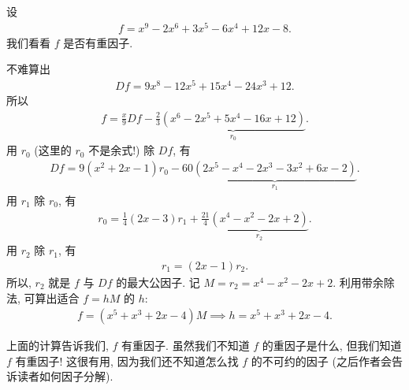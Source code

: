 \begin{example}
    设
    \begin{align*}
        f = x^9-2 x^6+3 x^5-6 x^4+12 x-8.
    \end{align*}
    我们看看 $f$ 是否有重因子.

    不难算出
    \begin{align*}
        Df = 9 x^8-12 x^5+15 x^4-24 x^3+12.
    \end{align*}
    所以
    \begin{align*}
        f = \frac{x}{9} Df - \frac{2}{3} \underbrace{(x^6-2 x^5+5 x^4-16 x+12)}_{r_0}.
    \end{align*}
    用 $r_0$ (这里的 $r_0$ 不是余式!) 除 $Df$, 有
    \begin{align*}
        Df = 9(x^2+2x-1) r_0 - 60 \underbrace{(2 x^5-x^4-2 x^3-3 x^2+6 x-2)}_{r_1}.
    \end{align*}
    用 $r_1$ 除 $r_0$, 有
    \begin{align*}
        r_0 = \frac{1}{4} (2x-3) r_1 + \frac{21}{4} \underbrace{(x^4-x^2-2 x+2)}_{r_2}.
    \end{align*}
    用 $r_2$ 除 $r_1$, 有
    \begin{align*}
        r_1 = (2x-1) r_2.
    \end{align*}
    所以, $r_2$ 就是 $f$ 与 $Df$ 的最大公因子. 记 $M = r_2 = x^4-x^2-2 x+2$. 利用带余除法, 可算出适合 $f = hM$ 的 $h$:
    \begin{align*}
        f = (x^5+x^3+2 x-4) M \implies h = x^5+x^3+2 x-4.
    \end{align*}

    上面的计算告诉我们, $f$ 有重因子. 虽然我们不知道 $f$ 的重因子是什么, 但我们知道 $f$ 有重因子! 这很有用, 因为我们还不知道怎么找 $f$ 的不可约的因子 (之后作者会告诉读者如何因子分解).


\end{example}

